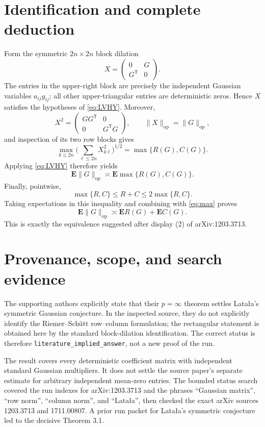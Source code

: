 \documentclass[11pt]{amsart}
\newcommand{\E}{\mathbf E}
\newcommand{\op}{\mathrm{op}}
\begin{document}
\section*{Identification and complete deduction}

Form the symmetric $2n\times2n$ block dilation
\[
                 X=\begin{pmatrix}0&G\\G^{\mathsf T}&0\end{pmatrix}.
\]
The entries in the upper-right block are precisely the independent Gaussian
variables $a_{ij}g_{ij}$; all other upper-triangular entries are deterministic
zeros.  Hence $X$ satisfies the hypotheses of \eqref{eq:LVHY}.  Moreover,
\[
 X^2=\begin{pmatrix}GG^{\mathsf T}&0\\0&G^{\mathsf T}G\end{pmatrix},
 \qquad \|X\|_{\op}=\|G\|_{\op},
\]
and inspection of its two row blocks gives
\[
       \max_{k\le2n}\Big(\sum_{\ell\le2n}X_{k\ell}^2\Big)^{1/2}
       =\max\{R(G),C(G)\}.
\]
Applying \eqref{eq:LVHY} therefore yields
\begin{equation}\label{eq:max}
              \E\|G\|_{\op}\asymp \E\max\{R(G),C(G)\}.
\end{equation}
Finally, pointwise,
\[
 \max\{R,C\}\le R+C\le2\max\{R,C\}.
\]
Taking expectations in this inequality and combining with \eqref{eq:max}
proves
\[
 \boxed{\displaystyle
 \E\|G\|_{\op}\asymp \E R(G)+\E C(G)}.
\]
This is exactly the equivalence suggested after display (2) of
arXiv:1203.3713.

\section*{Provenance, scope, and search evidence}

The supporting authors explicitly state that their $p=\infty$ theorem
settles Lata\l a's symmetric Gaussian conjecture.  In the inspected source,
they do not explicitly identify the Riemer--Sch\"utt row--column formulation;
the rectangular statement is obtained here by the standard block-dilation
identification.  The correct status is therefore
\texttt{literature\_implied\_answer}, not a new proof of the run.

The result covers every deterministic coefficient matrix with independent
standard Gaussian multipliers.  It does not settle the source paper's
separate estimate for arbitrary independent mean-zero entries.  The bounded
status search covered the run indexes for arXiv:1203.3713 and the phrases
``Gaussian matrix'', ``row norm'', ``column norm'', and ``Lata\l a'', then
checked the exact arXiv sources 1203.3713 and 1711.00807.  A prior run packet
for Lata\l a's symmetric conjecture led to the decisive Theorem 3.1.
\end{document}
